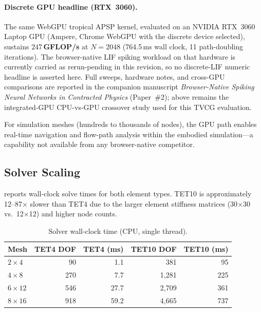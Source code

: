 \documentclass[journal]{IEEEtran}
\begin{document}
\paragraph{Discrete GPU headline (RTX~3060).}
The same WebGPU tropical APSP kernel, evaluated on an NVIDIA RTX~3060
Laptop GPU (Ampere, Chrome WebGPU with the discrete device selected),
sustains \textbf{$247$\,GFLOP/s} at $N = 2048$ (764.5\,ms wall clock,
11 path-doubling iterations). The browser-native LIF spiking workload on
that hardware is currently carried as rerun-pending in this revision,
so no discrete-LIF numeric headline is asserted here. Full sweeps,
hardware notes, and cross-GPU
comparisons are reported in the companion manuscript \emph{Browser-Native
Spiking Neural Networks in Contracted Physics} (Paper~\#2); 
above remains the integrated-GPU CPU-vs-GPU crossover study used for this
TVCG evaluation.

For simulation meshes (hundreds to thousands of nodes), the GPU path
enables real-time navigation and flow-path analysis within the embodied
simulation---a capability not available from any browser-native competitor.

\subsection{Solver Scaling}

 reports wall-clock solve times for both element types.
TET10 is approximately 12--87$\times$ slower than TET4 due to the larger
element stiffness matrices (30$\times$30 vs.\ 12$\times$12) and higher
node counts.

\begin{table}[t]
  \centering
  \caption{Solver wall-clock time (CPU, single thread).}
  \label{tab:scaling}
  \begin{tabular}{@{}lrrrr@{}}
    \toprule
    Mesh & TET4 DOF & TET4 (ms) & TET10 DOF & TET10 (ms) \\
    \midrule
    $2 \times 4$   &    90 &     1.1 &    381 &    95 \\
    $4 \times 8$   &   270 &     7.7 &  1,281 &   225 \\
    $6 \times 12$  &   546 &    27.7 &  2,709 &   361 \\
    $8 \times 16$  &   918 &    59.2 &  4,665 &   737 \\
    \bottomrule
  \end{tabular}
\end{table}
\end{document}

